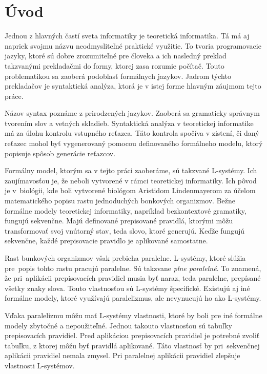 \chapter{Úvod}

Jednou z hlavných častí sveta informatiky je teoretická informatika. Tá má aj napriek svojmu názvu neodmysliteľné praktické využitie. To tvoria programovacie jazyky, ktoré sú dobre zrozumiteľné pre človeka a ich nasledný preklad takzvanými prekladačmi do formy, ktorej zasa rozumie počítač. Touto problematikou sa zaoberá podoblasť formálnych jazykov. Jadrom týchto prekladačov je syntaktická analýza, ktorá je v istej forme hlavným záujmom tejto práce.

Názov syntax poznáme z prirodzených jazykov. Zaoberá sa gramaticky správnym tvorením slov a vetných skladieb. Syntaktická analýza v teoretickej informatike má za úlohu kontrolu vstupného reťazca. Táto kontrola spočíva v zistení, či daný reťazec mohol byť vygenerovaný pomocou definovaného formálneho modelu, ktorý popisuje spôsob generácie reťazcov.

Formálny model, ktorým sa v tejto práci zaoberáme, sú takzvané L-systémy. Ich zaujímavosťou je, že neboli vytvorené v rámci teoretickej informatiky. Ich pôvod je v~biológii, kde boli vytvorené biológom Aristidom Lindenmayerom za účelom matematického popisu rastu jednoduchých bonkových organizmov. Bežne formálne modely teoretickej informatiky, napríklad bezkontextové gramatiky, fungujú sekvenčne. Majú definované prepisované pravidlá, ktorými môžu transformovať svoj vnútorný stav, teda slovo, ktoré generujú. Keďže fungujú sekvenčne, každé prepisovacie pravidlo je aplikované samostatne.

Rast bunkových organizmov však prebieha paralelne. L-systémy, ktoré slúžia pre~popis tohto rastu pracujú paralelne. Sú takzvane \textit{plne paralelné}. To znamená, že pri~aplikácii prepisovacích pravidiel musia byť naraz, teda paralelne, prepísané všetky znaky slova. Touto vlastnosťou sú L-systémy špecifické. Existujú aj iné formálne modely, ktoré využívajú paralelizmus, ale nevynucujú ho ako L-systémy.

Vďaka paralelizmu môžu mať L-systémy vlastnosti, ktoré by boli pre iné formálne modely zbytočné a nepoužiteľné. Jednou takouto vlastnosťou sú tabuľky prepisovacích pravidiel. Pred aplikáciou prepisovacích pravidiel je potrebné zvoliť tabuľku, z ktorej môžu byť pravidlá aplikované. Táto vlastnosť by pri~sekvenčnej aplikácii pravidiel nemala zmysel. Pri paralelnej aplikácii pravidiel zlepšuje vlastnosti L-systémov.


